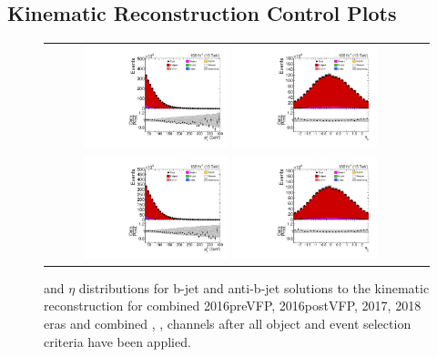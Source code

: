 \clearpage
\subsection{Kinematic Reconstruction Control Plots}

\begin{figure}[htb]
    \begin{center}
        \begin{tabular}{cc}
            \includegraphics[width=0.40\textwidth]{fig_fullRun2UL/controlplots/combined/HypBJetpT.pdf}
            \includegraphics[width=0.40\textwidth]{fig_fullRun2UL/controlplots/combined/HypBJetEta.pdf} \\
            \includegraphics[width=0.40\textwidth]{fig_fullRun2UL/controlplots/combined/HypAntiBJetpT.pdf}
            \includegraphics[width=0.40\textwidth]{fig_fullRun2UL/controlplots/combined/HypAntiBJetEta.pdf} 
        \end{tabular}
        \caption{\footnotesize \pT and $\eta$ distributions for b-jet and anti-b-jet solutions to the kinematic reconstruction for combined 2016preVFP, 2016postVFP, 2017, 2018 eras and combined \ee, \emu, \mumu channels after all object and event selection criteria have been applied.
}
\end{center}
\end{figure}
